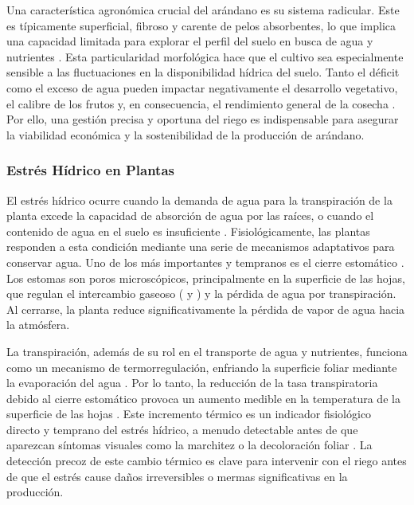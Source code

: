 Una característica agronómica crucial del arándano es su sistema radicular. Este es típicamente superficial, fibroso y carente de pelos absorbentes, lo que implica una capacidad limitada para explorar el perfil del suelo en busca de agua y nutrientes . Esta particularidad morfológica hace que el cultivo sea especialmente sensible a las fluctuaciones en la disponibilidad hídrica del suelo. Tanto el déficit como el exceso de agua pueden impactar negativamente el desarrollo vegetativo, el calibre de los frutos y, en consecuencia, el rendimiento general de la cosecha . Por ello, una gestión precisa y oportuna del riego es indispensable para asegurar la viabilidad económica y la sostenibilidad de la producción de arándano.

\subsubsection{Estrés Hídrico en Plantas}
\label{ssubsec:estres_hidrico}

El estrés hídrico ocurre cuando la demanda de agua para la transpiración de la planta excede la capacidad de absorción de agua por las raíces, o cuando el contenido de agua en el suelo es insuficiente . Fisiológicamente, las plantas responden a esta condición mediante una serie de mecanismos adaptativos para conservar agua. Uno de los más importantes y tempranos es el cierre estomático . Los estomas son poros microscópicos, principalmente en la superficie de las hojas, que regulan el intercambio gaseoso ( y ) y la pérdida de agua por transpiración. Al cerrarse, la planta reduce significativamente la pérdida de vapor de agua hacia la atmósfera.

La transpiración, además de su rol en el transporte de agua y nutrientes, funciona como un mecanismo de termorregulación, enfriando la superficie foliar mediante la evaporación del agua . Por lo tanto, la reducción de la tasa transpiratoria debido al cierre estomático provoca un aumento medible en la temperatura de la superficie de las hojas . Este incremento térmico es un indicador fisiológico directo y temprano del estrés hídrico, a menudo detectable antes de que aparezcan síntomas visuales como la marchitez o la decoloración foliar . La detección precoz de este cambio térmico es clave para intervenir con el riego antes de que el estrés cause daños irreversibles o mermas significativas en la producción.

